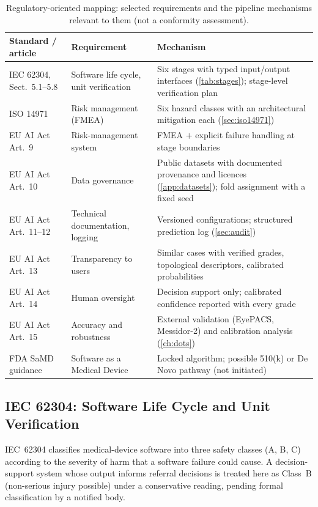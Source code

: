 \begin{table}[H]
\centering
\caption[Regulatory-oriented mapping of the pipeline mechanisms]{Regulatory-oriented
mapping: selected requirements and the pipeline mechanisms relevant to them (not a
conformity assessment).}
\label{tab:regmap}
\footnotesize
\begin{tabular}{@{}P{3.3cm}P{3.9cm}P{7.2cm}@{}}
\toprule
Standard / article & Requirement & Mechanism \\
\midrule
IEC 62304, Sect.\ 5.1--5.8 & Software life cycle, unit verification & Six stages with typed input/output interfaces (\cref{tab:stages}); stage-level verification plan \\
ISO 14971 & Risk management (FMEA) & Six hazard classes with an architectural mitigation each (\cref{sec:iso14971}) \\
EU AI Act Art.~9 & Risk-management system & FMEA $+$ explicit failure handling at stage boundaries \\
EU AI Act Art.~10 & Data governance & Public datasets with documented provenance and licences (\cref{app:datasets}); fold assignment with a fixed seed \\
EU AI Act Art.~11--12 & Technical documentation, logging & Versioned configurations; structured prediction log (\cref{sec:audit}) \\
EU AI Act Art.~13 & Transparency to users & Similar cases with verified grades, topological descriptors, calibrated probabilities \\
EU AI Act Art.~14 & Human oversight & Decision support only; calibrated confidence reported with every grade \\
EU AI Act Art.~15 & Accuracy and robustness & External validation (EyePACS, Messidor-2) and calibration analysis (\cref{ch:dots}) \\
FDA SaMD guidance & Software as a Medical Device & Locked algorithm; possible 510(k) or De Novo pathway (not initiated) \\
\bottomrule
\end{tabular}
\end{table}

\subsection{IEC 62304: Software Life Cycle and Unit Verification}
\label{sec:iec62304}

IEC~62304 classifies medical-device software into three safety classes (A, B, C)
according to the severity of harm that a software failure could cause. A decision-support
system whose output informs referral decisions is treated here as Class~B (non-serious
injury possible) under a conservative reading, pending formal classification by a
notified body.

